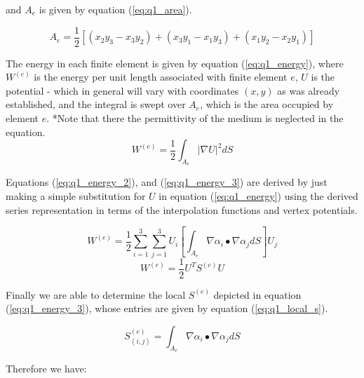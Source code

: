 \documentclass[11pt]{amsart}
\begin{document}
and $A_e$ is given by equation (\ref{eq:q1_area}).

\begin{equation}
    \label{eq:q1_area}
    A_e = \frac{1}{2}[(x_2y_3 - x_3y_2) + (x_3y_1 - x_1y_3) + (x_1y_2 - x_2y_1)]
\end{equation}


The energy in each finite element is given by equation (\ref{eq:q1_energy}), where $W^{(e)}$ is the energy per unit length associated with finite element $e$, $U$ is the potential - which in general will vary with coordinates $(x,y)$ as was already established, and the integral is swept over $A_e$, which is the area occupied by element $e$. \footnotesize{*Note that there the permittivity of the medium is neglected in the equation}.
\begin{equation}
	\label{eq:q1_energy}
	W^{(e)} = \frac{1}{2} \int_{A_e}| \nabla U|^2 dS
\end{equation}

Equations (\ref{eq:q1_energy_2}), and (\ref{eq:q1_energy_3}) are derived by just making a simple substitution for $U$ in equation (\ref{eq:q1_energy}) using the derived series representation in terms of the interpolation functions and vertex potentials.

\begin{equation}
	\label{eq:q1_energy_2}
	W^{(e)} = \frac{1}{2}\sum^{3}_{i=1}\sum^{3}_{j=1}U_{i}\left[ \int_{A_e} \nabla \alpha_i \bullet \nabla \alpha_j dS \right]U_{j}
\end{equation}
\begin{equation}
	\label{eq:q1_energy_3}
	W^{(e)} = \frac{1}{2} U^T S^{(e)} U
\end{equation}

Finally we are able to determine the local $S^{(e)}$ depicted in equation (\ref{eq:q1_energy_3}), whose entries are given by equation (\ref{eq:q1_local_s}).

\begin{equation}
	\label{eq:q1_local_s}
	S^{(e)}_{(i,j)} = \int_{A_e} \nabla \alpha_i \bullet \nabla \alpha_j dS
\end{equation}

Therefore we have:
\end{document}
